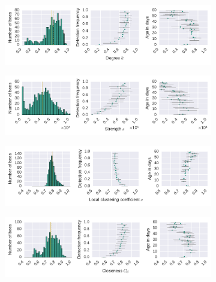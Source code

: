 \begin{figure}[!htb]
	\centering
	\begin{subfigure}[b]{1.0\textwidth}
	\centering
	\includegraphics[width=1.0\textwidth]{Figures/n3-stat-degreeAgeDetF.pdf}
	\end{subfigure}
	\begin{subfigure}[b]{1.0\textwidth}
	\centering
	\includegraphics[width=1.0\textwidth]{Figures/n3-stat-strengthAgeDetF.pdf}
	\end{subfigure}
	\begin{subfigure}[b]{1.0\textwidth}
	\centering
	\includegraphics[width=1.0\textwidth]{Figures/n3-stat-lccAgeDetF.pdf}
	\end{subfigure}
	\begin{subfigure}[b]{1.0\textwidth}
	\centering
	\includegraphics[width=1.0\textwidth]{Figures/n3-stat-closenessAgeDetF.pdf}

\end{subfigure}
\end{figure}

